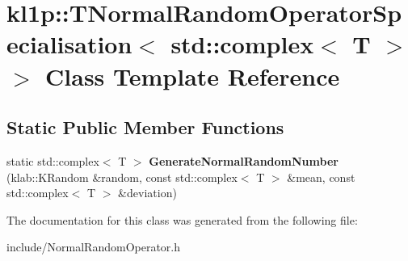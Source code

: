 \hypertarget{classkl1p_1_1TNormalRandomOperatorSpecialisation_3_01std_1_1complex_3_01T_01_4_01_4}{}\section{kl1p\+:\+:T\+Normal\+Random\+Operator\+Specialisation$<$ std\+:\+:complex$<$ T $>$ $>$ Class Template Reference}
\label{classkl1p_1_1TNormalRandomOperatorSpecialisation_3_01std_1_1complex_3_01T_01_4_01_4}
\subsection*{Static Public Member Functions}
\begin{DoxyCompactItemize}
\item 
static std\+::complex$<$ T $>$ {\bfseries Generate\+Normal\+Random\+Number} (klab\+::\+K\+Random \&random, const std\+::complex$<$ T $>$ \&mean, const std\+::complex$<$ T $>$ \&deviation)\hypertarget{classkl1p_1_1TNormalRandomOperatorSpecialisation_3_01std_1_1complex_3_01T_01_4_01_4_acaf0cd0c1b184fe355614481019d0acb}{}\label{classkl1p_1_1TNormalRandomOperatorSpecialisation_3_01std_1_1complex_3_01T_01_4_01_4_acaf0cd0c1b184fe355614481019d0acb}

\end{DoxyCompactItemize}


The documentation for this class was generated from the following file\+:\begin{DoxyCompactItemize}
\item 
include/Normal\+Random\+Operator.\+h\end{DoxyCompactItemize}
